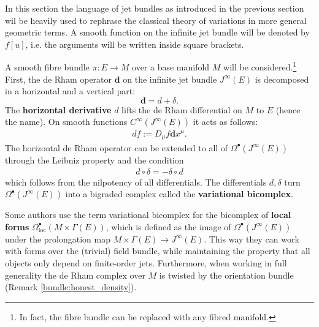     In this section the language of jet bundles as introduced in the previous section wil be heavily used to rephrase the classical theory of variations in more general geometric terms. A smooth function on the infinite jet bundle will be denoted by $f[u]$, i.e. the arguments will be written inside square brackets.

    A smooth fibre bundle $\pi:E\rightarrow M$ over a base manifold $M$ will be considered.\footnote{In fact, the fibre bundle can be replaced with any fibred manifold.} First, the de Rham operator $\mathbf{d}$ on the infinite jet bundle $J^\infty(E)$ is decomposed in a horizontal and a vertical part: \[\mathbf{d} = d+\delta.\] The \textbf{horizontal derivative} $d$ lifts the de Rham differential on $M$ to $E$ (hence the name). On smooth functions $C^\infty(J^\infty(E))$ it acts as follows:
    \begin{gather}
        df := D_\mu f\mathbf{d}x^\mu.
    \end{gather}
    The horizontal de Rham operator can be extended to all of $\Omega^\bullet(J^\infty(E))$ through the Leibniz property and the condition
    \begin{gather}
        d\circ\delta = -\delta\circ d
    \end{gather}
    which follows from the nilpotency of all differentials. The differentials $d,\delta$ turn $\Omega^\bullet(J^\infty(E))$ into a bigraded complex called the \textbf{variational bicomplex}.
    \begin{remark}
        Some authors use the term variational bicomplex for the bicomplex of \textbf{local forms} $\Omega^\bullet_\mathrm{loc}(M\times\Gamma(E))$, which is defined as the image of $\Omega^\bullet(J^\infty(E))$ under the prolongation map $M\times\Gamma(E)\rightarrow J^\infty(E)$. This way they can work with forms over the (trivial) field bundle, while maintaining the property that all objects only depend on finite-order jets. Furthermore, when working in full generality the de Rham complex over $M$ is twisted by the orientation bundle (Remark \ref{bundle:honest_density}).
    \end{remark}


